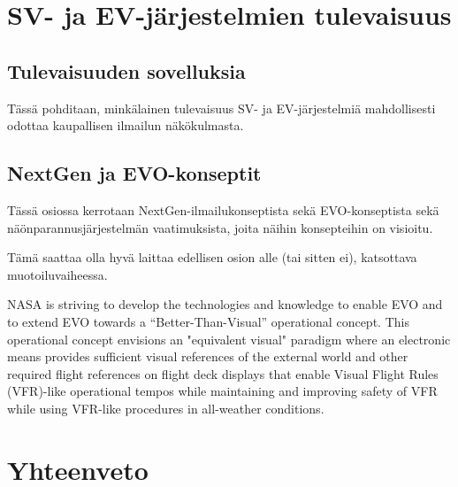 \documentclass[utf8,bachelor,manualbib]{gradu3}
\begin{document}
\chapter{SV- ja EV-järjestelmien tulevaisuus}

\section{Tulevaisuuden sovelluksia}

Tässä pohditaan, minkälainen tulevaisuus SV- ja EV-järjestelmiä mahdollisesti odottaa kaupallisen ilmailun näkökulmasta.

\section{NextGen ja EVO-konseptit}

Tässä osiossa kerrotaan NextGen-ilmailukonseptista sekä EVO-konseptista sekä näönparannusjärjestelmän vaatimuksista, joita näihin konsepteihin on visioitu.

Tämä saattaa olla hyvä laittaa edellisen osion alle (tai sitten ei), katsottava muotoiluvaiheessa.

NASA is striving to develop the technologies and knowledge to enable EVO and to extend EVO towards a “Better-Than-Visual” operational concept. This operational concept envisions an "equivalent visual" paradigm where an electronic means provides sufficient visual references of the external world and other required flight references on flight deck displays that enable Visual Flight Rules (VFR)-like operational tempos while maintaining and improving safety of VFR while using VFR-like procedures in all-weather conditions.\citep{prinzel2013}


\chapter{Yhteenveto}


\end{document}
